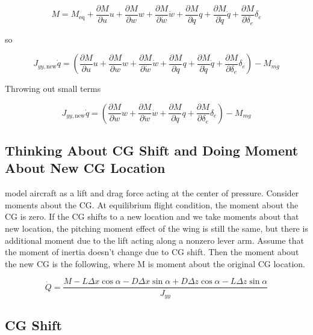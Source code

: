 \begin{equation*}
  M=M_{\text{eq}}+\frac{\partial{}M}{\partial{}u}u+\frac{\partial{}M}{\partial{}w}w+\frac{\partial{}M}{\partial\dot{w}}\dot{w}+\frac{\partial{}M}{\partial{}q}q+\frac{\partial{}M}{\partial\dot{q}}\dot{q}+\frac{\partial{}M}{\partial\delta_{e}}\delta_{e}
\end{equation*}

so

\begin{equation*}
  J_{yy,\text{new}}\dot{q}=\left(\frac{\partial{}M}{\partial{}u}u+\frac{\partial{}M}{\partial{}w}w+\frac{\partial{}M}{\partial\dot{w}}\dot{w}+\frac{\partial{}M}{\partial{}q}q+\frac{\partial{}M}{\partial\dot{q}}\dot{q}+\frac{\partial{}M}{\partial\delta_{e}}\delta_{e}\right)-M_{mg}
\end{equation*}

Throwing out small terms

\begin{equation*}
  J_{yy,\text{new}}\dot{q}=\left(\frac{\partial{}M}{\partial{}w}w+\frac{\partial{}M}{\partial\dot{w}}\dot{w}+\frac{\partial{}M}{\partial{}q}q+\frac{\partial{}M}{\partial\delta_{e}}\delta_{e}\right)-M_{mg}
\end{equation*}

\subsection{Thinking About CG Shift and Doing Moment About New CG Location}

model aircraft as a lift and drag force acting at the center of pressure.
Consider moments about the CG.\@
At equilibrium flight condition, the moment about the CG is zero.
If the CG shifts to a new location and we take moments about that new location, the pitching moment effect of the wing is still the same, but there is additional moment due to the lift acting along a nonzero lever arm.
Assume that the moment of inertia doesn't change due to CG shift.
Then the moment about the new CG is the following, where M is moment about the original CG location.

\begin{equation*}
  \dot{Q}=\frac{M-L\Delta x\cos\alpha-D\Delta x\sin\alpha+D\Delta z\cos\alpha-L\Delta z\sin\alpha}{J_{yy}}
\end{equation*}

\subsection{CG Shift}

